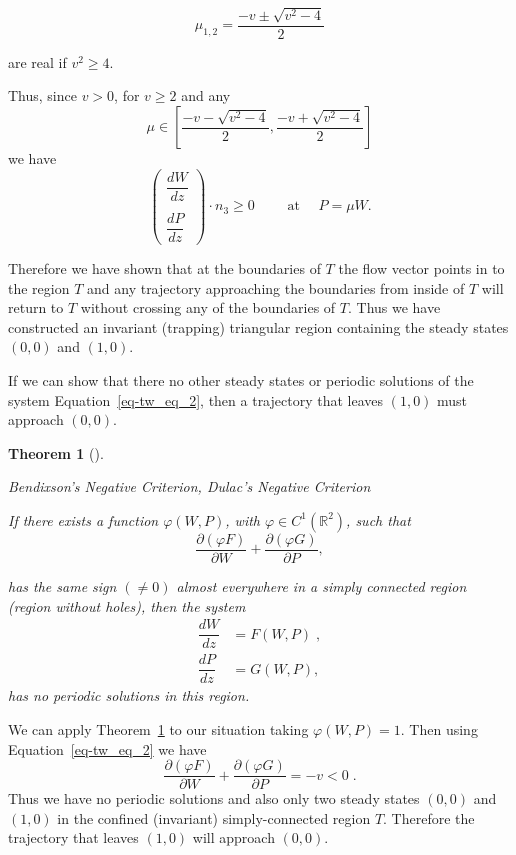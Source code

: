\documentclass[
  letterpaper,
  DIV=11,
  numbers=noendperiod]{scrreprt}
\theoremstyle{plain}
\newtheorem{theorem}{Theorem}[chapter]
\theoremstyle{definition}
\theoremstyle{plain}
\theoremstyle{remark}
\begin{document}
\[
\mu_{1,2} = \frac{ - v \pm \sqrt{ v^2 -4}} 2
\]

are real if \(v^2 \geq 4\).

Thus, since \(v >0\), for \(v \geq 2\) and any \[
\mu\in \left[ \dfrac{ - v -\sqrt{ v^2 -4}} 2, \dfrac{ - v +\sqrt{ v^2 -4}} 2 \right]
\] we have \[
\begin{pmatrix} 
\dfrac{ dW}{dz} \\  \\ \dfrac{dP}{dz}
\end{pmatrix} \cdot n_3 \geq 0 \qquad \text{ at } \quad P=\mu W. 
\]

Therefore we have shown that at the boundaries of \(T\) the flow vector
points in to the region \(T\) and any trajectory approaching the
boundaries from inside of \(T\) will return to \(T\) without crossing
any of the boundaries of \(T\). Thus we have constructed an invariant
(trapping) triangular region containing the steady states \((0,0)\) and
\((1,0)\).

If we can show that there no other steady states or periodic solutions
of the system Equation~\ref{eq-tw_eq_2}, then a trajectory that leaves
\((1,0)\) must approach \((0,0)\).

\begin{theorem}[]\protect\hypertarget{thm-bendixson}{}\label{thm-bendixson}

Bendixson's Negative Criterion, Dulac's Negative Criterion

If there exists a function \(\varphi(W,P)\), with
\(\varphi \in C^1(\mathbb R^2)\), such that \[
 \frac{\partial(\varphi F )}{\partial W} +  \frac{\partial(\varphi G )}{\partial P},
\]

has the same sign \((\neq 0)\) almost everywhere in a simply connected
region (region without holes), then the system \[
 \begin{aligned}
 \dfrac{ dW}{dz} &= F(W,P) \; , 
 \\   \dfrac{dP}{dz} &= G(W,P),
\end{aligned}
\] has no periodic solutions in this region.

\end{theorem}

We can apply Theorem~\ref{thm-bendixson} to our situation taking
\(\varphi(W,P) = 1\). Then using Equation~\ref{eq-tw_eq_2} we have \[
 \frac{\partial(\varphi F )}{\partial W} +  \frac{\partial(\varphi G )}{\partial P} = - v < 0\; .
\] Thus we have no periodic solutions and also only two steady states
\((0,0)\) and \((1,0)\) in the confined (invariant) simply-connected
region \(T\). Therefore the trajectory that leaves \((1,0)\) will
approach \((0,0)\).
\end{document}
